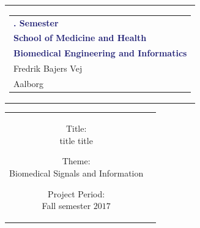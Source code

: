 % 
\thispagestyle{empty}
\begin{nopagebreak}
	{\samepage 
		
		\begin{tabular}{r}
			\parbox{\textwidth}{  
				\hfill \hspace{2cm} \parbox{8cm}{\begin{tabular}{l} %
						{\small \textbf{\textcolor{MidnightBlue}{{$1$. Semester}}}}\\
						{\small \textbf{\textcolor{MidnightBlue}{School of Medicine and Health}}}\\
						{\small \textbf{\textcolor{MidnightBlue}{Biomedical Engineering and Informatics }}}\\
						{\small \textcolor{NavyBlue}{Fredrik Bajers Vej $7$}} \\
						{\small \textcolor{NavyBlue}{$9220$ Aalborg}} \\
			\end{tabular}}}
		\end{tabular}
		
		\begin{tabular}{cc}
			\parbox{7cm}{
				\begin{description}

\item {Title:} \\
title title\\

\item {Theme:} \\
Biomedical Signals and Information \\

\end{description}

\parbox{8cm}{

\begin{description}
\item {Project Period:}\\
   Fall semester $2017$\\
   

\end{description}}}
\end{tabular}}
\end{nopagebreak}

